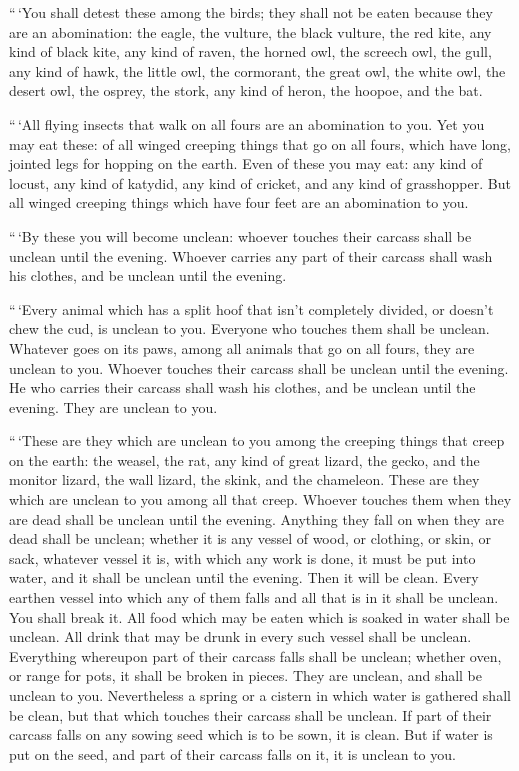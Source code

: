  ``\,`You shall detest these among the birds; they shall
not be eaten because they are an abomination: the eagle, the vulture,
the black vulture,  the red kite, any kind of black kite,
 any kind of raven,  the horned owl, the
screech owl, the gull, any kind of hawk,  the little owl,
the cormorant, the great owl,  the white owl, the desert
owl, the osprey,  the stork, any kind of heron, the hoopoe,
and the bat.

 ``\,`All flying insects that walk on all fours are an
abomination to you.  Yet you may eat these: of all winged
creeping things that go on all fours, which have long, jointed legs for
hopping on the earth.  Even of these you may eat: any kind
of locust, any kind of katydid, any kind of cricket, and any kind of
grasshopper.  But all winged creeping things which have
four feet are an abomination to you.

 ``\,`By these you will become unclean: whoever touches
their carcass shall be unclean until the evening.  Whoever
carries any part of their carcass shall wash his clothes, and be unclean
until the evening.

 ``\,`Every animal which has a split hoof that isn't
completely divided, or doesn't chew the cud, is unclean to you. Everyone
who touches them shall be unclean.  Whatever goes on its
paws, among all animals that go on all fours, they are unclean to you.
Whoever touches their carcass shall be unclean until the evening.
 He who carries their carcass shall wash his clothes, and
be unclean until the evening. They are unclean to you.

 ``\,`These are they which are unclean to you among the
creeping things that creep on the earth: the weasel, the rat, any kind
of great lizard,  the gecko, and the monitor lizard, the
wall lizard, the skink, and the chameleon.  These are they
which are unclean to you among all that creep. Whoever touches them when
they are dead shall be unclean until the evening.  Anything
they fall on when they are dead shall be unclean; whether it is any
vessel of wood, or clothing, or skin, or sack, whatever vessel it is,
with which any work is done, it must be put into water, and it shall be
unclean until the evening. Then it will be clean.  Every
earthen vessel into which any of them falls and all that is in it shall
be unclean. You shall break it.  All food which may be
eaten which is soaked in water shall be unclean. All drink that may be
drunk in every such vessel shall be unclean.  Everything
whereupon part of their carcass falls shall be unclean; whether oven, or
range for pots, it shall be broken in pieces. They are unclean, and
shall be unclean to you.  Nevertheless a spring or a
cistern in which water is gathered shall be clean, but that which
touches their carcass shall be unclean.  If part of their
carcass falls on any sowing seed which is to be sown, it is clean.
 But if water is put on the seed, and part of their carcass
falls on it, it is unclean to you.

